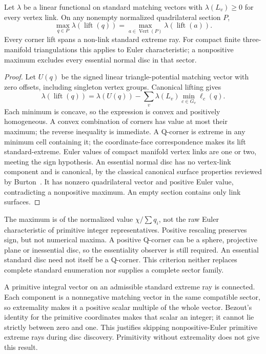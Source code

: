 \begin{proposition}
Let $\lambda$ be a linear functional on standard matching vectors with
$\lambda(L_v)\ge0$ for every vertex link. On any nonempty normalized
quadrilateral section $P$,
\[
 \max_{q\in P}\lambda(\operatorname{lift}(q))
 =\max_{a\in\operatorname{Vert}(P)}\lambda(\operatorname{lift}(a)).
\]
Every corner lift spans a non-link standard extreme ray. For compact finite
three-manifold triangulations this applies to Euler characteristic; a
nonpositive maximum excludes every essential normal disc in that sector.
\end{proposition}
\begin{proof}
Let $U(q)$ be the signed linear triangle-potential matching vector with
zero offsets, including singleton vertex groups. Canonical lifting gives
\[
 \lambda(\operatorname{lift}(q))=\lambda(U(q))-
       \sum_v\lambda(L_v)\min_{c\in G_v}\ell_c(q).
\]
Each minimum is concave, so the expression is convex and positively
homogeneous. A convex combination of corners has value at most their
maximum; the reverse inequality is immediate. A Q-corner is extreme in
any minimum cell containing it; the coordinate-face correspondence makes
its lift standard-extreme. Euler values of compact manifold vertex links
are one or two, meeting the sign hypothesis. An essential normal disc has
no vertex-link component and is canonical, by the classical canonical
surface properties reviewed by Burton~\cite{burton-convert}. It has
nonzero quadrilateral vector and positive Euler value, contradicting a
nonpositive maximum. An empty section contains only link surfaces.
\end{proof}

The maximum is of the normalized value $\chi/\sum q_i$, not the raw Euler
characteristic of primitive integer representatives. Positive rescaling
preserves sign, but not numerical maxima. A positive Q-corner can be a
sphere, projective plane or inessential disc, so the essentiality observer
is still required. An essential standard disc need not itself be a
Q-corner. This criterion neither replaces complete standard enumeration
nor supplies a complete sector family.

A primitive integral vector on an admissible standard extreme ray is
connected. Each component is a nonnegative matching vector in the same
compatible sector, so extremality makes it a positive scalar multiple of
the whole vector. Bezout's identity for the primitive coordinates makes
that scalar an integer; it cannot lie strictly between zero and one.
This justifies skipping nonpositive-Euler primitive extreme rays during
disc discovery. Primitivity without extremality does not give this result.

